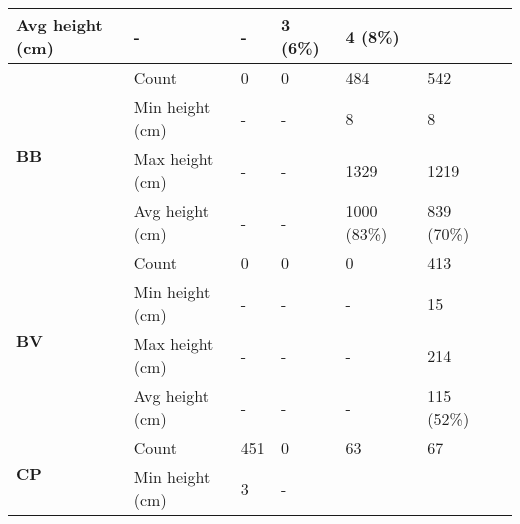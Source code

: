 \begin{longtable}{|p{2cm}|p{2cm}|p{2cm}|p{2cm}|p{2cm}|p{2cm}|p{2cm}|}
						\multicolumn{1}{l|}{Avg height (cm)} & 
						\multicolumn{1}{l|}{-} & 
						\multicolumn{1}{l|}{-} &
						\multicolumn{1}{l|}{3 (6\%)} & 
						\multicolumn{1}{l|}{4 (8\%)} \\\cline{2-7}
		\hline            
		\multirow{4}{*}{\textbf{BB}} & 
						\multicolumn{1}{l|}{Count} & 
						\multicolumn{1}{l|}{0} & 
						\multicolumn{1}{l|}{0} &
						\multicolumn{1}{l|}{484} & 
						\multicolumn{1}{l|}{542} \\\cline{2-7} &
						\multicolumn{1}{l|}{Min height (cm)} & 
						\multicolumn{1}{l|}{-} & 
						\multicolumn{1}{l|}{-} &
						\multicolumn{1}{l|}{8} & 
						\multicolumn{1}{l|}{8} \\\cline{2-7} &
						\multicolumn{1}{l|}{Max height (cm)} & 
						\multicolumn{1}{l|}{-} & 
						\multicolumn{1}{l|}{-} &
						\multicolumn{1}{l|}{1329} & 
						\multicolumn{1}{l|}{1219} \\\cline{2-7} &
						\multicolumn{1}{l|}{Avg height (cm)} & 
						\multicolumn{1}{l|}{-} & 
						\multicolumn{1}{l|}{-} &
						\multicolumn{1}{l|}{1000 (83\%)} & 
						\multicolumn{1}{l|}{839 (70\%)} \\\cline{2-7}
		\hline            
		\multirow{4}{*}{\textbf{BV}} & 
						\multicolumn{1}{l|}{Count} & 
						\multicolumn{1}{l|}{0} & 
						\multicolumn{1}{l|}{0} &
						\multicolumn{1}{l|}{0} & 
						\multicolumn{1}{l|}{413} \\\cline{2-7} &
						\multicolumn{1}{l|}{Min height (cm)} & 
						\multicolumn{1}{l|}{-} & 
						\multicolumn{1}{l|}{-} &
						\multicolumn{1}{l|}{-} & 
						\multicolumn{1}{l|}{15} \\\cline{2-7} &
						\multicolumn{1}{l|}{Max height (cm)} & 
						\multicolumn{1}{l|}{-} & 
						\multicolumn{1}{l|}{-} &
						\multicolumn{1}{l|}{-} & 
						\multicolumn{1}{l|}{214} \\\cline{2-7} &
						\multicolumn{1}{l|}{Avg height (cm)} & 
						\multicolumn{1}{l|}{-} & 
						\multicolumn{1}{l|}{-} &
						\multicolumn{1}{l|}{-} & 
						\multicolumn{1}{l|}{115 (52\%)} \\\cline{2-7}
		\hline    
		\multirow{4}{*}{\textbf{CP}} & 
						\multicolumn{1}{l|}{Count} & 
						\multicolumn{1}{l|}{451} & 
						\multicolumn{1}{l|}{0} &
						\multicolumn{1}{l|}{63} & 
						\multicolumn{1}{l|}{67} \\\cline{2-7} &
						\multicolumn{1}{l|}{Min height (cm)} & 
						\multicolumn{1}{l|}{3} & 
						\multicolumn{1}{l|}{-} &

\end{longtable}
